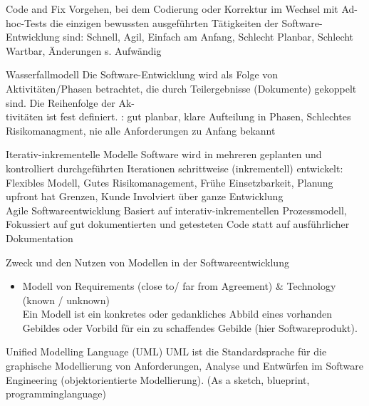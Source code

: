 \begin{definition}{Code and Fix}
Vorgehen, bei dem Codierung oder Korrektur im Wechsel mit Ad-hoc-Tests die einzigen bewussten ausgeführten Tätigkeiten der Software-Entwicklung sind: Schnell, Agil, Einfach am Anfang, Schlecht Planbar, Schlecht Wartbar, Änderungen s. Aufwändig
\end{definition}

\begin{definition}{Wasserfallmodell}
Die Software-Entwicklung wird als Folge von Aktivitäten/Phasen betrachtet, die durch Teilergebnisse (Dokumente) gekoppelt sind. Die Reihenfolge der Ak-\\
tivitäten ist fest definiert. : gut planbar, klare Aufteilung in Phasen, Schlechtes Risikomanagment, nie alle Anforderungen zu Anfang bekannt
\end{definition}

\begin{definition}{Iterativ-inkrementelle Modelle}
Software wird in mehreren geplanten und kontrolliert durchgeführten Iterationen schrittweise (inkrementell) entwickelt: Flexibles Modell, Gutes Risikomanagement, Frühe Einsetzbarkeit, Planung upfront hat Grenzen, Kunde Involviert über ganze Entwicklung\\
Agile Softwareentwicklung Basiert auf interativ-inkrementellen Prozessmodell, Fokussiert auf gut dokumentierten und getesteten Code statt auf ausführlicher Dokumentation
\end{definition}

\begin{concept}{Zweck und den Nutzen von Modellen in der Softwareentwicklung}
\begin{itemize}
  \item Modell von Requirements (close to/ far from Agreement) \& Technology (known / unknown)\\
Ein Modell ist ein konkretes oder gedankliches Abbild eines vorhanden Gebildes oder Vorbild für ein zu schaffendes Gebilde (hier Softwareprodukt).
\end{itemize}
\end{concept}

\begin{definition}{Unified Modelling Language (UML)}
UML ist die Standardsprache für die graphische Modellierung von Anforderungen, Analyse und Entwürfen im Software Engineering (objektorientierte Modellierung). (As a sketch, blueprint, programminglanguage)
\end{definition}

